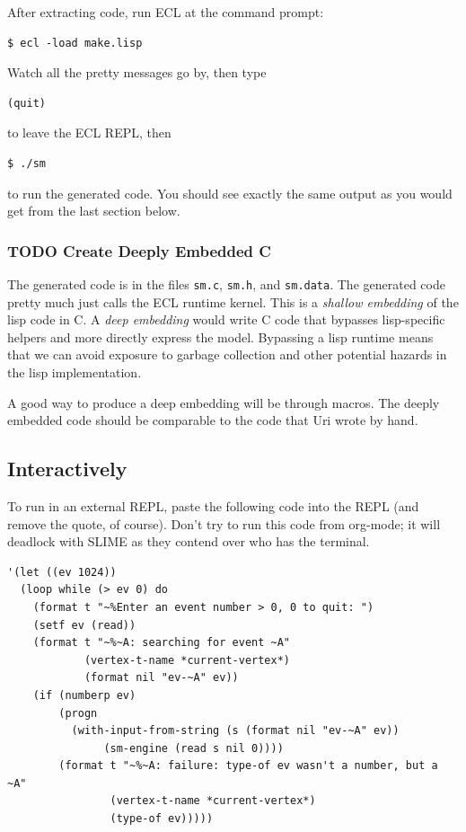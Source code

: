 \documentclass[10pt,oneside,x11names]{article}
\begin{document}
After extracting code, run ECL at the command prompt:
\begin{verbatim}
$ ecl -load make.lisp
\end{verbatim}
Watch all the pretty messages go by, then type
\begin{verbatim}
(quit)
\end{verbatim}
to leave the ECL REPL, then
\begin{verbatim}
$ ./sm
\end{verbatim}
to run the generated code. You should see exactly the same output as you
would get from the last section below.

\subsubsection{{\bfseries\sffamily TODO} Create Deeply Embedded C}
\label{sec:org2431914}

The generated code is in the files \texttt{sm.c}, \texttt{sm.h}, and \texttt{sm.data}.  The
generated code pretty much just calls the ECL runtime kernel. This is a
\emph{shallow embedding} of the lisp code in C.  A \emph{deep embedding} would write C
code that bypasses lisp-specific helpers and more directly express the model.
Bypassing a lisp runtime means that we can avoid exposure to garbage
collection and other potential hazards in the lisp implementation.

A good way to produce a deep embedding will be through macros.  The deeply
embedded code should be comparable to the code that Uri wrote by hand.

\subsection{Interactively}
\label{sec:org0ea24c6}

To run in an external REPL, paste the following code into the REPL (and remove
the quote, of course). Don't try to run this code from org-mode; it will
deadlock with SLIME as they contend over who has the terminal.

\begin{verbatim}
'(let ((ev 1024))
  (loop while (> ev 0) do
    (format t "~%Enter an event number > 0, 0 to quit: ")
    (setf ev (read))
    (format t "~%~A: searching for event ~A"
            (vertex-t-name *current-vertex*)
            (format nil "ev-~A" ev))
    (if (numberp ev)
        (progn
          (with-input-from-string (s (format nil "ev-~A" ev))
               (sm-engine (read s nil 0))))
        (format t "~%~A: failure: type-of ev wasn't a number, but a ~A"
                (vertex-t-name *current-vertex*)
                (type-of ev)))))

\end{verbatim}
\end{document}
